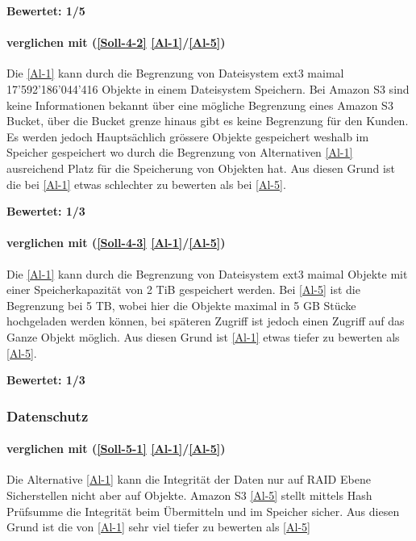 \textbf{Bewertet: 1/5}

\paragraph*{  verglichen mit  (\ref{Soll-4-2} \ref{Al-1}/\ref{Al-5})} 
Die \ref{Al-1} kann durch die Begrenzung von Dateisystem ext3 maimal 17'592'186'044'416 Objekte in einem Dateisystem Speichern. Bei Amazon S3 sind keine Informationen bekannt über eine mögliche Begrenzung eines Amazon S3 Bucket, über die Bucket grenze hinaus gibt es keine Begrenzung für den Kunden. Es werden jedoch Hauptsächlich grössere Objekte gespeichert weshalb im Speicher gespeichert wo durch die Begrenzung von Alternativen \ref{Al-1} ausreichend Platz für die Speicherung von Objekten hat. Aus diesen Grund ist die  bei \ref{Al-1} etwas schlechter zu bewerten als bei \ref{Al-5}.

\textbf{Bewertet: 1/3}

\paragraph*{  verglichen mit  (\ref{Soll-4-3} \ref{Al-1}/\ref{Al-5})} 
Die \ref{Al-1} kann durch die Begrenzung von Dateisystem ext3 maimal Objekte mit einer Speicherkapazität von 2 TiB gespeichert werden. Bei \ref{Al-5} ist die Begrenzung bei 5 TB, wobei hier die Objekte maximal in 5 GB Stücke hochgeladen werden können, bei späteren Zugriff ist jedoch einen Zugriff auf das Ganze Objekt möglich. Aus diesen Grund ist \ref{Al-1} etwas tiefer zu bewerten als \ref{Al-5}.

\textbf{Bewertet: 1/3}

\subsubsection{Datenschutz}

\paragraph*{  verglichen mit  (\ref{Soll-5-1} \ref{Al-1}/\ref{Al-5})} 
Die Alternative \ref{Al-1} kann die Integrität der Daten nur auf RAID Ebene Sicherstellen nicht aber auf Objekte. Amazon S3 \ref{Al-5} stellt mittels Hash Prüfsumme die Integrität beim Übermitteln und im Speicher sicher. Aus diesen Grund ist die  von \ref{Al-1} sehr viel tiefer zu bewerten als \ref{Al-5}

